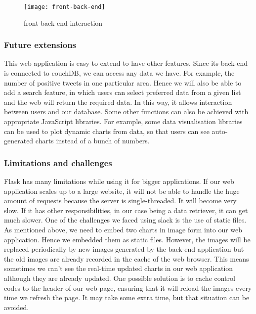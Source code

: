 \begin{figure}[h]
\centering
\texttt{[image: front-back-end]}
\caption{front-back-end interaction}
\end{figure}

\subsubsection{Future extensions}
This web application is easy to extend to have other features. Since its back-end is connected to couchDB, we can access any data we have. For example, the number of positive tweets in one particular area. Hence we will also be able to add a search feature, in which users can select preferred data from a given list and the web will return the required data. In this way, it allows interaction between users and our database. Some other functions can also be achieved with appropriate JavaScript libraries. For example, some data visualisation libraries can be used to plot dynamic charts from data, so that users can see auto-generated charts instead of a bunch of numbers.

\subsubsection{Limitations and challenges}
Flask has many limitations while using it for bigger applications. If our web application scales up to a large website, it will not be able to handle the huge amount of requests because the server is single-threaded. It will become very slow. If it has other responsibilities, in our case being a data retriever, it can get much slower. 
One of the challenges we faced using slack is the use of static files. As mentioned above, we need to embed two charts in image form into our web application. Hence we embedded them as static files. However, the images will be replaced periodically by new images generated by the back-end application but the old images are already recorded in the cache of the web browser. This means sometimes we can’t see the real-time updated charts in our web application although they are already updated. One possible solution is to cache control codes to the header of our web page, ensuring that it will reload the images every time we refresh the page. It may take some extra time, but that situation can be avoided.
